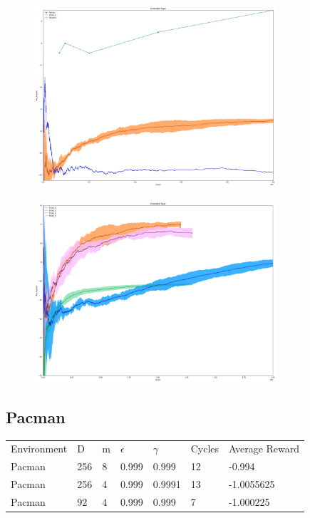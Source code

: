 \documentclass{article}
\theoremstyle{definition}
\newtheorem{primary statistics}[definition]{Primary Statistics}
\newtheorem{auxiliary statistics}[definition]{Auxiliary Statistics}
\begin{document}
 \begin{figure}[h]
 \centering
    \includegraphics[width=9cm]{RvVvU_Extended_Tiger}
\end{figure}

 \begin{figure}[h]
 \centering
    \includegraphics[width=9cm]{BT_Extended_Tiger}
\end{figure}

\newpage

\subsection{Pacman}
 \begin{tabular}{lllllll}
 \centering
Environment & D & m & $\epsilon$ & $\gamma$ & Cycles & Average Reward \\
Pacman      & 256       & 8           & 0.999       & 0.999             & 12     & -0.994        \\
Pacman      & 256       & 4           & 0.999       & 0.9991            & 13     & -1.0055625       \\
Pacman      & 92        & 4           & 0.999       & 0.999             & 7      &    -1.000225           
\end{tabular}
\end{document}
